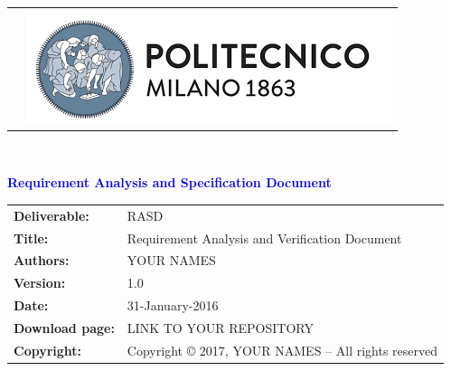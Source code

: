 




\begin{titlepage}



{\begin{table}[t!]
\centering
\begin{tabu} to \textwidth { X[1.3,r,p] X[1.7,l,p] }
\textcolor{Blue}
{\textbf{\small{}}} & \includegraphics[scale=0.5]{Images/PolimiLogo}
\end{tabu}
\end{table}}~\\ [7cm]


\begin{flushleft}

{\textcolor{Blue}{\textbf{\Huge{Requirement Analysis and Specification
        Document}}}} \\ [1cm]

\end{flushleft}

\end{titlepage}

\begin{table}[h!]
\begin{tabu} to \textwidth { X[0.3,r,p] X[0.7,l,p] }
\hline

\textbf{Deliverable:} & RASD\\
\textbf{Title:} & Requirement Analysis and Verification Document \\
\textbf{Authors:} & YOUR NAMES \\
\textbf{Version:} & 1.0 \\ 
\textbf{Date:} & 31-January-2016 \\
\textbf{Download page:} & LINK TO YOUR REPOSITORY \\
\textbf{Copyright:} & Copyright © 2017, YOUR NAMES – All rights reserved \\
\hline
\end{tabu}
\end{table}




